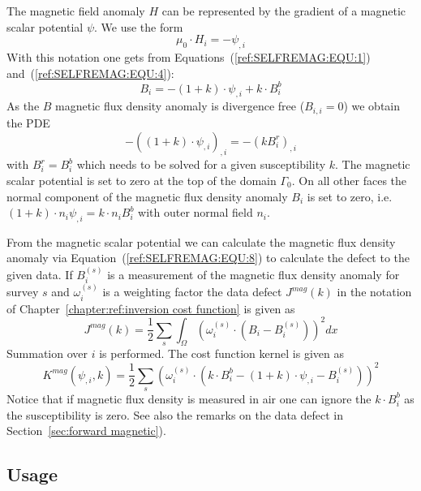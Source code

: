 The magnetic field anomaly $H$ can be represented by the gradient of a
magnetic scalar potential $\psi$.
We use the form 
\begin{equation}\label{ref:SELFREMAG:EQU:6}
\mu_0  \cdot H_i = - \psi_{,i}
\end{equation}
With this notation one gets from Equations~(\ref{ref:SELFREMAG:EQU:1}) and~(\ref{ref:SELFREMAG:EQU:4}):
\begin{equation}\label{ref:SELFREMAG:EQU:7}
B_i = - (1+k) \cdot \psi_{,i}  + k \cdot B^b_i
\end{equation}
As the $B$ magnetic flux density anomaly is divergence free ($B_{i,i}=0$) we obtain the PDE
\begin{equation}\label{ref:SELFREMAG:EQU:8}
- ( (1+k) \cdot \psi_{,i})_{,i} = - (k B^r_i)_{,i} 
\end{equation} 
with $B^r_i=B^b_i$ which needs to be solved for a given susceptibility $k$.
The magnetic scalar potential is set to zero at the top of the domain
$\Gamma_{0}$.
On all other faces the normal component of the magnetic flux density anomaly
$B_i$ is set to zero, i.e. $(1+k) \cdot  n_i \psi_{,i} = k \cdot n_i  B^b_i$ with outer
normal field $n_i$.

From the magnetic scalar potential we can calculate the magnetic flux density
anomaly via Equation~(\ref{ref:SELFREMAG:EQU:8}) to calculate the defect to the given
data.
If $B^{(s)}_i$ is a measurement of the magnetic flux density anomaly for
survey $s$ and $\omega^{(s)}_i$ is a weighting factor the data defect
$J^{mag}(k)$ in the notation of Chapter~\ref{chapter:ref:inversion cost function} is given as
\begin{equation}\label{ref:SELFREMAG:EQU:9}
J^{mag}(k) = \frac{1}{2}\sum_{s} \int_{\Omega} ( \omega^{(s)}_i \cdot (B_{i}- B^{(s)}_i) ) ^2 dx
\end{equation} 
Summation over $i$ is performed.
The cost function kernel is given as
\begin{equation}\label{ref:SELFREMAG:EQU:10}
K^{mag}(\psi_{,i},k) = \frac{1}{2}\sum_{s} ( \omega^{(s)}_i \cdot (k \cdot B^b_i - (1+k) \cdot \psi_{,i} - B^{(s)}_i) ) ^2
\end{equation} 
Notice that if magnetic flux density is measured in air one can ignore the
$k\cdot B^b_i$ as the susceptibility is zero. See also the remarks on the data defect in Section~\ref{sec:forward magnetic}).


\subsection{Usage}

